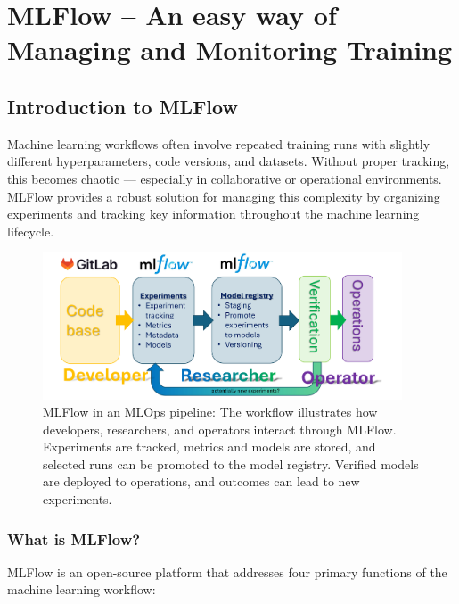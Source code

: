 \chapter{MLFlow – An easy way of Managing and Monitoring Training}

%
\section{Introduction to MLFlow}

Machine learning workflows often involve repeated training runs with slightly different hyperparameters, code versions, and datasets. Without proper tracking, this becomes chaotic — especially in collaborative or operational environments. MLFlow provides a robust solution for managing this complexity by organizing experiments and tracking key information throughout the machine learning lifecycle.

\begin{figure}[htbp]
    \centering
    \includegraphics[width=0.95\textwidth]{images/mlflow_flow.png}
    \caption{MLFlow in an MLOps pipeline: The workflow illustrates how developers, researchers, and operators interact through MLFlow. Experiments are tracked, metrics and models are stored, and selected runs can be promoted to the model registry. Verified models are deployed to operations, and outcomes can lead to new experiments.}
    \label{fig:mlflow_pipeline}
\end{figure}


\subsection{What is MLFlow?}

MLFlow is an open-source platform that addresses four primary functions of the machine learning workflow:

